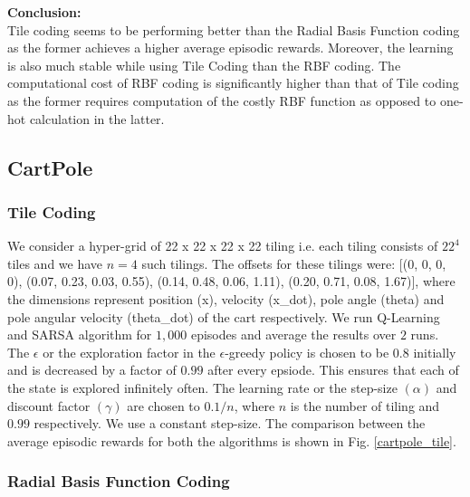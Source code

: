 \documentclass{article}
\begin{document}
        \noindent %
        \textbf{Conclusion:} \\
          Tile coding seems to be performing better than the Radial Basis Function coding 
          as the former achieves a higher average episodic rewards. Moreover, the learning is 
          also much stable while using Tile Coding than the RBF coding. The computational cost 
          of RBF coding is significantly higher than that of Tile coding as the former 
          requires computation of the costly RBF function as opposed to one-hot calculation in
          the latter.  

    \subsection{CartPole}
        \subsubsection{Tile Coding}
        We consider a hyper-grid of 22 x 22 x 22 x 22 tiling i.e. each tiling consists of $22^{4}$ tiles and we have $n=4$ such tilings. The offsets for these 
        tilings were: [(0, 0, 0, 0), (0.07, 0.23, 0.03, 0.55), (0.14, 0.48, 0.06, 1.11), (0.20, 0.71, 0.08, 1.67)], where the dimensions represent position (x), 
        velocity (x\_dot), pole angle (theta) and pole angular velocity (theta\_dot) of the cart respectively. We run Q-Learning and SARSA algorithm for $1,000$ episodes and 
        average the results over $2$ runs. The $\epsilon$ or the exploration factor in the $\epsilon$-greedy policy is chosen to be $0.8$ initially and is 
        decreased by a factor of $0.99$ after every epsiode. This ensures that each of the state is explored infinitely often. The learning rate or the step-size 
        $(\alpha)$ and discount factor $(\gamma)$ are chosen to $0.1/n$, where $n$ is the number of tiling and $0.99$ respectively. We use a constant step-size.
        The comparison between the average episodic rewards for both the algorithms is shown in Fig. \ref{cartpole_tile}.

        \subsubsection{Radial Basis Function Coding}
\end{document}
